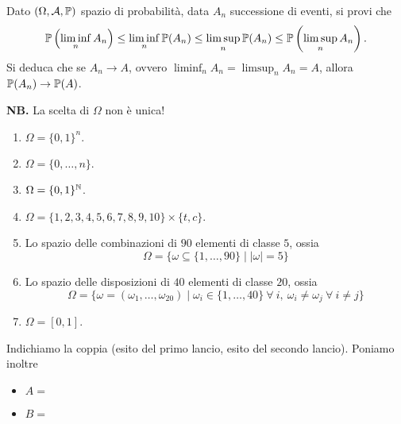 \Esercizio{$\star$}

Dato $(\Omega,\mathcal{A},\mathbb{P})$ spazio di probabilità, data $A_{n}$ successione di eventi, si provi che
\begin{equation*}
	\mathbb{P}\left(\liminf_{n} A_{n}\right) \leq \liminf_{n}\mathbb{P}(A_{n}) \leq \limsup_{n}\mathbb{P}(A_{n})\leq \mathbb{P}\left(\limsup_{n} A_{n}\right) .
\end{equation*}
Si deduca che se $A_{n}\rightarrow A$, ovvero $\liminf_{n} A_{n} =\limsup_{n} A_{n} =A$, allora $\mathbb{P}(A_{n})\rightarrow \mathbb{P}(A)$.

\ParteSoluzioni

\Soluzione


\textbf{NB.} La scelta di $\Omega $ non è unica!
\begin{enumerate}
	\item $\Omega =\{0,1\}^{n} .$
	\item $\Omega =\{0,\dots ,n\}$.
	\item $\Omega =\{0,1\}^{\mathbb{N}}$.
	\item $\Omega =\{1,2,3,4,5,6,7,8,9,10\} \times \{t,c\}$.
	\item Lo spazio delle combinazioni di $90$ elementi di classe $5$, ossia
	\begin{equation*}
		\Omega =\{\omega \subseteq \{1,\dots ,90\} \mid |\omega |=5\}
	\end{equation*}
	\item Lo spazio delle disposizioni di $40$ elementi di classe $20$, ossia
	\begin{equation*}
		\Omega =\{\omega =(\omega_{1} ,\dots ,\omega_{20}) \mid \omega_{i} \in \{1,\dots ,40\} \ \forall \ i,\ \omega_{i} \neq \omega_{j} \ \forall \ i\neq j\}
	\end{equation*}
	\item $\Omega =[0,1]$.
\end{enumerate}

\Soluzione

Indichiamo la coppia (esito del primo lancio, esito del secondo lancio). Poniamo inoltre
\begin{itemize}
	\item $A=$ 
	\item $B=$ 
\end{itemize}

